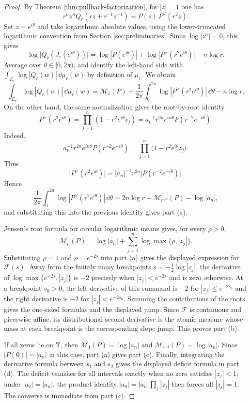 \begin{proof}
By Theorem \ref{thm:pullback-factorization}, for \(|z|=1\) one has
\[
r^n z^n Q_r\!\left(r z+r^{-1}z^{-1}\right)=P(z)\,P^{\vee}(r^2 z).
\]
Set \(z=e^{i\theta}\) and take logarithmic absolute values, using the lower-truncated logarithmic convention from Section \ref{sec:preliminaries}. Since \(\log|z^n|=0\), this gives
\[
\log\bigl|Q_r(J_r(e^{i\theta}))\bigr|
=
\log|P(e^{i\theta})|+\log|P^\vee(r^2 e^{i\theta})|-n\log r.
\]
Average over \(\theta\in[0,2\pi)\), and identify the left-hand side with \(\int_{E_r}\log|Q_r(w)|\,\dd\mu_r(w)\) by definition of \(\mu_r\). We obtain
\[
\int_{E_r}\log|Q_r(w)|\,\dd\mu_r(w)
=\mathcal M_1(P)+\frac1{2\pi}\int_{0}^{2\pi}\log|P^\vee(r^2 e^{i\theta})|\,\dd\theta-n\log r.
\]
On the other hand, the same normalization gives the root-by-root identity
\[
P^\vee(r^2 e^{i\theta})
=\prod_{j=1}^{n}(1-r^2e^{i\theta}z_j)
=a_n^{-1}r^{2n}e^{in\theta}P(r^{-2}e^{-i\theta}).
\]
Indeed,
\[
a_n^{-1}r^{2n}e^{in\theta}P(r^{-2}e^{-i\theta})
=\prod_{j=1}^{n}\bigl(1-r^2e^{i\theta}z_j\bigr).
\]
Thus
\[
\bigl|P^\vee(r^2 e^{i\theta})\bigr|=|a_n|^{-1}r^{2n}\bigl|P(r^{-2}e^{-i\theta})\bigr|.
\]
Hence
\[
\frac1{2\pi}\int_{0}^{2\pi}\log|P^\vee(r^2 e^{i\theta})|\,\dd\theta
=2n\log r+\mathcal M_{r^{-2}}(P)-\log|a_n|,
\]
 and substituting this into the previous identity gives part \textup{(a)}.

Jensen's root formula for circular logarithmic means gives, for every \(\rho>0\),
\[
\mathcal M_\rho(P)=\log|a_n|+
\sum_{j=1}^{n}\log\max\{\rho,|z_j|\}.
\]
Substituting \(\rho=1\) and \(\rho=e^{-2s}\) into part \textup{(a)} gives the displayed expression for \(\mathcal F(s)\).  Away from the finitely many breakpoints \(s=-\frac12\log|z_j|\), the derivative of \(\log\max\{e^{-2s},|z_j|\}\) is \(-2\) precisely when \(|z_j|<e^{-2s}\) and is zero otherwise.  At a breakpoint \(s_0>0\), the left derivative of this summand is \(-2\) for \(|z_j|\le e^{-2s_0}\) and the right derivative is \(-2\) for \(|z_j|<e^{-2s_0}\).  Summing the contributions of the roots gives the one-sided formulas and the displayed jump.  Since \(\mathcal F\) is continuous and piecewise affine, its distributional second derivative is the atomic measure whose mass at each breakpoint is the corresponding slope jump.  This proves part \textup{(b)}.

If all zeros lie on \(\mathbb{T}\), then \(\mathcal M_1(P)=\log|a_n|\) and \(\mathcal M_{r^{-2}}(P)=\log|a_n|\).  Since \(|P(0)|=|a_n|\) in this case, part \textup{(a)} gives part \textup{(c)}.  Finally, integrating the derivative formula between \(s_1\) and \(s_2\) gives the displayed deficit formula in part \textup{(d)}.  The deficit vanishes for all intervals exactly when no zero satisfies \(|z_j|<1\); under \(|a_0|=|a_n|\), the product identity \(|a_0|=|a_n|\prod_j|z_j|\) then forces all \(|z_j|=1\).  The converse is immediate from part \textup{(c)}.
\end{proof}

